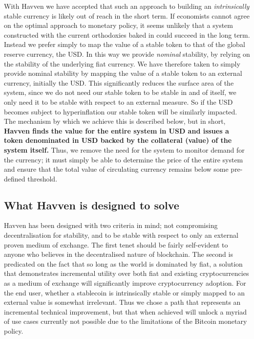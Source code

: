 \noindent With Havven we have accepted that such an approach to building an \textit{intrinsically} stable
currency is likely out of reach in the short term.
If economists cannot agree on the optimal approach to monetary policy, it seems unlikely that a system
constructed with the current orthodoxies baked in could succeed in the long term.
Instead we prefer simply to map the value of a stable token to that of the global reserve currency, the USD.
In this way we provide \textit{nominal} stability, by relying on the stability of the underlying
fiat currency.
We have therefore taken to simply provide nominal stability by mapping the value of a stable token to an
external currency, initially the USD. This significantly reduces the surface area of the system,
since we do not need our stable token to be stable in and of itself, 
we only need it to be stable with respect to an external measure.
So if the USD becomes subject to hyperinflation our stable token will be similarly impacted.
The mechanism by which we achieve this is described below, but in short,
\textbf{Havven finds the value for the entire system in USD and issues a token denominated in
USD backed by the collateral (value) of the system itself.}
Thus, we remove the need for the system to monitor demand for the currency;
it must simply be able to determine the price of the entire system and ensure that the total value of
circulating currency remains below some pre-defined threshold. \\

\subsection{What Havven is designed to solve}

\noindent Havven has been designed with two criteria in mind; not compromising decentralisation for stability, and to be stable with respect to only an external proven medium of exchange. The first tenet should be fairly self-evident to anyone who believes in the decentralised nature of blockchain. The second is predicated on the fact that so long as the world is dominated by fiat, a solution that demonstrates incremental utility over both fiat and existing cryptocurrencies as a medium of exchange will significantly improve cryptocurrency adoption. For the end user, whether a stablecoin is intrinsically stable or simply mapped to an external value is somewhat irrelevant. Thus we chose a path that represents an incremental technical improvement, but that when achieved will unlock a myriad of use cases currently not possible due to the limitations of the Bitcoin monetary policy. \\

